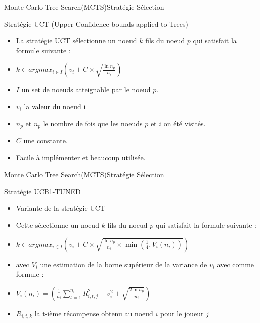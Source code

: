 \begin{frame}{Monte Carlo Tree Search(MCTS)}{Stratégie Sélection}
	\begin{block}{Stratégie UCT (Upper Confidence bounds applied to Trees)}
		\begin{itemize}
			\item La stratégie UCT sélectionne un noeud $k$ fils du noeud $p$ qui satisfait la formule suivante :
			\item $k \in argmax_{i\in I}(v_{i} + C \times \sqrt{\frac{\ln n_{p}}{n_{i}}})$
			\item $I$ un set de noeuds atteignable par le noeud $p$.
			\item $v_{i}$ la valeur du noeud i
			\item $n_{p}$ et $n_{p}$ le nombre de fois que les noeuds $p$ et $i$ on été visités.
			\item $C$ une constante.
			\item Facile à implémenter et beaucoup utilisée.
		\end{itemize}
	\end{block}
\end{frame}

\begin{frame}{Monte Carlo Tree Search(MCTS)}{Stratégie Sélection}
	\begin{block}{Stratégie UCB1-TUNED}
		\begin{itemize}
			\item Variante de la stratégie UCT
			\item Cette sélectionne un noeud $k$ fils du noeud $p$ qui satisfait la formule suivante :
			\item $k \in argmax_{i\in I}(v_{i} + C \times \sqrt{\frac{\ln n_{p}}{n_{i}}\times \min(\frac{1}{4}, V_{i}(n_{i}))})$
			\item avec $V_{i}$ une estimation de la borne supérieur de la variance de $v_{i}$ avec comme formule :
			\item $V_{i}(n_{i}) = (\frac{1}{n_{i}}\sum_{t=1}^{n_{i}}R_{i,t,j}^2 - v_{i}^2 + \sqrt{\frac{2\ln n_{p}}{n_{i}}})$
			\item $R_{i,t,k}$ la t-ième récompense obtenu au noeud $i$ pour le joueur $j$
		\end{itemize}
	\end{block}
\end{frame}

